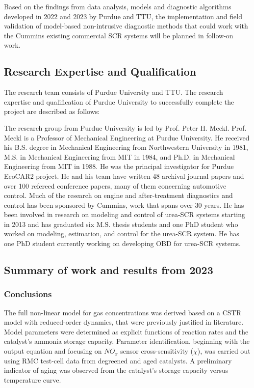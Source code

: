 Based on the findings from data analysis, models and diagnostic algorithms
developed in 2022 and 2023 by Purdue and TTU, the implementation and field
validation of model-based non-intrusive diagnostic methods that could work with
the Cummins existing commercial SCR systems will be planned in follow-on work.

\subsection{Research Expertise and Qualification}
The research team consists of Purdue University and TTU. The research expertise and qualification of Purdue University to successfully complete the project are described as follows:

The research group from Purdue University is led by Prof. Peter H. Meckl. Prof.
Meckl is a Professor of Mechanical Engineering at Purdue University. He
received his B.S. degree in Mechanical Engineering from Northwestern University
in 1981, M.S. in Mechanical Engineering from MIT in 1984, and Ph.D. in
Mechanical Engineering from MIT in 1988. He was the principal investigator for
Purdue EcoCAR2 project. He and his team have written 48 archival journal papers
and over 100 refereed conference papers, many of them concerning automotive
control. Much of the research on engine and after-treatment diagnostics and
control has been sponsored by Cummins, work that spans over 30 years. He has
been involved in research on modeling and control of urea-SCR systems starting
in 2013 and has graduated six M.S. thesis students and one PhD student who
worked on modeling, estimation, and control for the urea-SCR system. He has one
PhD student currently working on developing OBD for urea-SCR systems.



\subsection{Summary of work and results from 2023}









\subsubsection{Conclusions}
The full non-linear model for gas concentrations was derived based on a CSTR
model with reduced-order dynamics, that were previously justified in
literature. Model parameters were determined as explicit functions of reaction
rates and the catalyst's ammonia storage capacity.  Parameter identification,
beginning with the output equation and focusing on $NO_x$ sensor
cross-sensitivity ($\chi$), was carried out using RMC test-cell data from
degreened and aged catalysts. A preliminary indicator of aging was observed
from the catalyst's storage capacity versus temperature curve.
